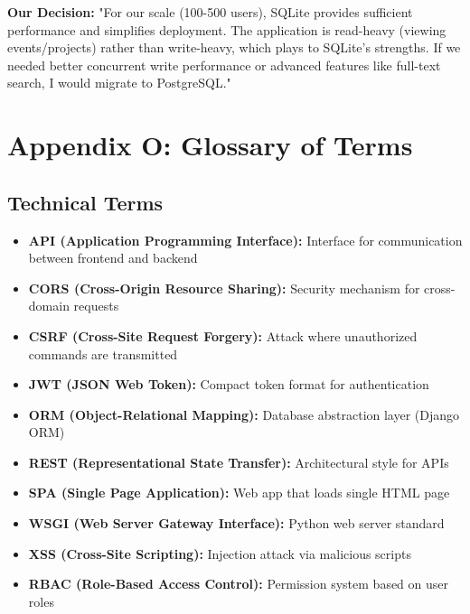 \documentclass[11pt,a4paper]{article}
\begin{document}
\textbf{Our Decision:} "For our scale (100-500 users), SQLite provides sufficient performance and simplifies deployment. The application is read-heavy (viewing events/projects) rather than write-heavy, which plays to SQLite's strengths. If we needed better concurrent write performance or advanced features like full-text search, I would migrate to PostgreSQL."

\section{Appendix O: Glossary of Terms}

\subsection{Technical Terms}
\begin{itemize}[leftmargin=*]
    \item \textbf{API (Application Programming Interface):} Interface for communication between frontend and backend
    \item \textbf{CORS (Cross-Origin Resource Sharing):} Security mechanism for cross-domain requests
    \item \textbf{CSRF (Cross-Site Request Forgery):} Attack where unauthorized commands are transmitted
    \item \textbf{JWT (JSON Web Token):} Compact token format for authentication
    \item \textbf{ORM (Object-Relational Mapping):} Database abstraction layer (Django ORM)
    \item \textbf{REST (Representational State Transfer):} Architectural style for APIs
    \item \textbf{SPA (Single Page Application):} Web app that loads single HTML page
    \item \textbf{WSGI (Web Server Gateway Interface):} Python web server standard
    \item \textbf{XSS (Cross-Site Scripting):} Injection attack via malicious scripts
    \item \textbf{RBAC (Role-Based Access Control):} Permission system based on user roles
\end{itemize}
\end{document}
